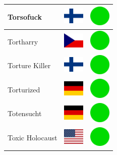 \documentclass[12pt, a4paper, twoside]{report}
\begin{document}
\begin{center}
\begin{longtable}{|p{5cm}|p{2cm}|p{2cm}|}
 Torsofuck                                                  & \includegraphics[width=1cm]{../4x3/fi} &   \includegraphics[width=1cm]{../likes/y} \\ \hline
 Tortharry                                                  & \includegraphics[width=1cm]{../4x3/cz} &   \includegraphics[width=1cm]{../likes/y} \\ \hline
 Torture Killer                                             & \includegraphics[width=1cm]{../4x3/fi} &   \includegraphics[width=1cm]{../likes/y} \\ \hline
 Torturized                                                 & \includegraphics[width=1cm]{../4x3/de} &   \includegraphics[width=1cm]{../likes/y} \\ \hline
 Totensucht                                                 & \includegraphics[width=1cm]{../4x3/de} &   \includegraphics[width=1cm]{../likes/y} \\ \hline
 Toxic Holocaust                                            & \includegraphics[width=1cm]{../4x3/us} &   \includegraphics[width=1cm]{../likes/y} \\ \hline

\end{longtable}
\end{center}
\end{document}
